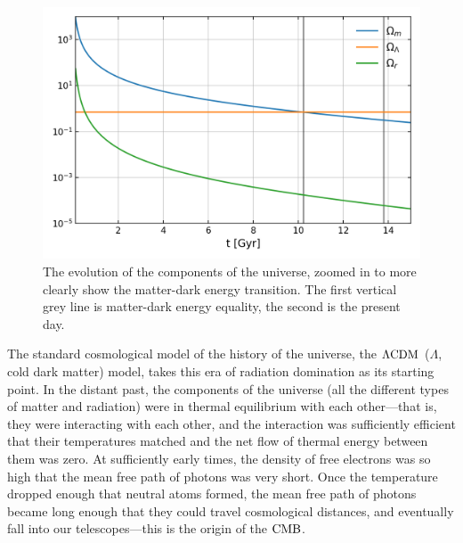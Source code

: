 \begin{figure}[h!]
\centering     %
    \includegraphics[width=.75\columnwidth]{plots/lcdm_components_linear.png}
\caption{
    The evolution of the components of the universe, zoomed in to more clearly
    show the matter-dark energy transition. The first vertical grey line is
    matter-dark energy equality, the second is the present day.
}\label{fig:lcdm_components_linear}
\end{figure}



    The standard cosmological model of the history of the universe,
    the $\Lambda\text{CDM}$ ($\Lambda$, cold dark matter) model, takes this
    era of radiation domination as its starting point.
    In the distant past, the components of the universe (all the different types of matter and radiation)
    were in thermal equilibrium with each other---that is, they were interacting with each other,
    and the interaction was sufficiently efficient that their temperatures matched
    and the net flow of thermal energy between them was zero.
    At sufficiently early times, the density of free electrons
    was so high that the mean free path of photons was very short. Once the temperature
    dropped enough that neutral atoms formed, the mean free path of photons became long
    enough that they could travel cosmological distances, and eventually fall into our telescopes---this
    is the origin of the $\text{CMB}$.


